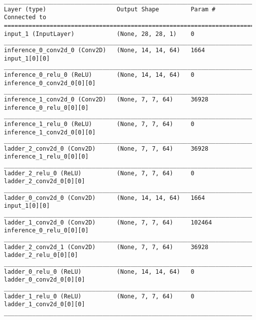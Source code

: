 \begin{lstlisting}[caption={\textsc{Mnist}-VLAE-factor-1 Encoder},captionpos=b,basicstyle=\tiny, label={lst:sparsity-vlae-encoder-28-fm1}]
__________________________________________________________________________________________________
Layer (type)                    Output Shape         Param #     Connected to
==================================================================================================
input_1 (InputLayer)            (None, 28, 28, 1)    0
__________________________________________________________________________________________________
inference_0_conv2d_0 (Conv2D)   (None, 14, 14, 64)   1664        input_1[0][0]
__________________________________________________________________________________________________
inference_0_relu_0 (ReLU)       (None, 14, 14, 64)   0           inference_0_conv2d_0[0][0]
__________________________________________________________________________________________________
inference_1_conv2d_0 (Conv2D)   (None, 7, 7, 64)     36928       inference_0_relu_0[0][0]
__________________________________________________________________________________________________
inference_1_relu_0 (ReLU)       (None, 7, 7, 64)     0           inference_1_conv2d_0[0][0]
__________________________________________________________________________________________________
ladder_2_conv2d_0 (Conv2D)      (None, 7, 7, 64)     36928       inference_1_relu_0[0][0]
__________________________________________________________________________________________________
ladder_2_relu_0 (ReLU)          (None, 7, 7, 64)     0           ladder_2_conv2d_0[0][0]
__________________________________________________________________________________________________
ladder_0_conv2d_0 (Conv2D)      (None, 14, 14, 64)   1664        input_1[0][0]
__________________________________________________________________________________________________
ladder_1_conv2d_0 (Conv2D)      (None, 7, 7, 64)     102464      inference_0_relu_0[0][0]
__________________________________________________________________________________________________
ladder_2_conv2d_1 (Conv2D)      (None, 7, 7, 64)     36928       ladder_2_relu_0[0][0]
__________________________________________________________________________________________________
ladder_0_relu_0 (ReLU)          (None, 14, 14, 64)   0           ladder_0_conv2d_0[0][0]
__________________________________________________________________________________________________
ladder_1_relu_0 (ReLU)          (None, 7, 7, 64)     0           ladder_1_conv2d_0[0][0]
__________________________________________________________________________________________________

\end{lstlisting}
